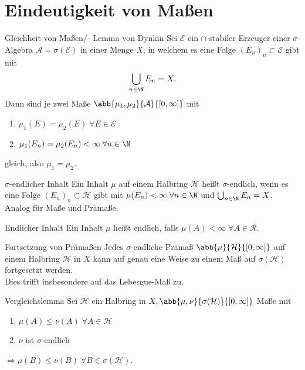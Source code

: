 \section*{Eindeutigkeit von Maßen}

\begin{karte}{Gleichheit von Maßen/- Lemma von Dynkin}
	Sei \( \mathcal{E} \) ein \(\cap\)-stabiler Erzeuger einer \( \sigma \)-Algebra \( \mathcal{A} = \sigma(\mathcal{E}) \) 
	in einer Menge \(X\), in welchem es eine Folge \( (E_n)_n \subset \mathcal{E} \) gibt mit 
	\[ \bigcup_{n\in\N} E_n = X. \] 
	Dann sind je zwei Maße \( \abb{\mu_1, \mu_2}{\mathcal{A}}{[0,\infty]} \) mit 
	\begin{enumerate}
		\item \( \mu_1(E) = \mu_2(E) \;\forall E\in \mathcal{E} \) 
		\item \( \mu_1(E_n) = \mu_2(E_n) < \infty \;\forall n\in \N \)
	\end{enumerate}
	gleich, also \(\mu_1 = \mu_2\).
\end{karte}

\begin{karte}{\(\sigma\)-endlicher Inhalt}
	Ein Inhalt \(\mu\) auf einem Halbring \( \mathcal{H} \) heißt 
	\( \sigma \)-endlich, wenn es eine Folge \( (E_n)_n \subset \mathcal{H} \) gibt mit 
	\( \mu(E_n) < \infty \;\forall n\in\N\) und \( \bigcup_{n\in\N} E_n = X \).
	Analog für Maße und Prämaße.
\end{karte}

\begin{karte}{Endlicher Inhalt}
	Ein Inhalt \(\mu\) heißt endlich, falls \( \mu(A) < \infty \;\forall A\in \mathcal{R} \).
\end{karte}

\begin{karte}{Fortsetzung von Prämaßen}
	Jedes \( \sigma \)-endliche Prämaß \(\abb{\mu}{\mathcal{H}}{[0,\infty]}\) auf einem Halbring 
	\( \mathcal{H} \) in \(X\) kann auf genau eine Weise zu einem Maß auf 
	\( \sigma(\mathcal{H}) \) fortgesetzt werden.\\
	Dies trifft insbesondere auf das Lebesgue-Maß zu.
\end{karte}

\begin{karte}{Vergleichslemma}
	Sei \( \mathcal{H} \) ein Halbring in \(X, \abb{\mu, \nu}{\sigma(\mathcal{H})}{[0,\infty]} \) Maße mit 
	\begin{enumerate}
		\item \( \mu(A) \leq \nu(A) \;\forall A\in \mathcal{H} \)
		\item \( \nu \) ist \(\sigma\)-endlich 
	\end{enumerate}
	\( \Rightarrow \mu(B) \leq \nu(B) \;\forall B\in \sigma(\mathcal{H})\).
\end{karte}